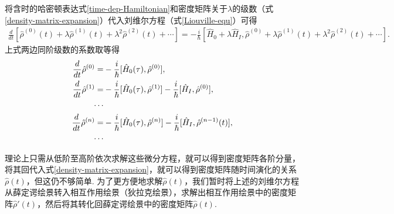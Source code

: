 \documentclass{assignment}
\begin{document}
将含时的哈密顿表达式\eqref{time-dep-Hamiltonian}和密度矩阵关于$\lambda$的级数（式\eqref{density-matrix-expansion}）代入刘维尔方程（式\eqref{Liouville-equ}）可得
\begin{align}
    \frac{d}{dt}\left[\hat{\rho}^{(0)}(t)+\lambda\hat{\rho}^{(1)}(t)+\lambda^2\hat{\rho}^{(2)}(t)+\cdots\right]=-\frac{i}{\hbar}\left[\hat{H}_0+\lambda\hat{H}_I,\hat{\rho}^{(0)}+\lambda\hat{\rho}^{(1)}(t)+\lambda^2\hat{\rho}^{(2)}(t)+\cdots\right].
\end{align}
上式两边同阶级数的系数取等得
\begin{align}
    \frac{d}{dt}\hat{\rho}^{(0)}=&-\frac{i}{\hbar}[\hat{H}_0(\tau),\hat{\rho}^{(0)}],\\
    \frac{d}{dt}\hat{\rho}^{(1)}=&-\frac{i}{\hbar}[\hat{H}_0(\tau),\hat{\rho}^{(1)}]-\frac{i}{\hbar}[\hat{H}_I,\hat{\rho}^{(0)}],\\
    \notag\cdots&\\
    \frac{d}{dt}\hat{\rho}^{(n)}=&-\frac{i}{\hbar}[\hat{H}_0(\tau),\hat{\rho}^{(n)}]-\frac{i}{\hbar}[\hat{H}_I,\hat{\rho}^{(n-1)}(t)],\\
    \notag\cdots&
\end{align}

理论上只需从低阶至高阶依次求解这些微分方程，就可以得到密度矩阵各阶分量，将其回代入式\eqref{density-matrix-expansion}，就可以得到密度矩阵随时间演化的关系$\hat{\rho}(t)$，但这仍不够简单. 为了更方便地求解$\hat{\rho}(t)$，我们暂时将上述的刘维尔方程从薛定谔绘景转入相互作用绘景（狄拉克绘景），求解出相互作用绘景中的密度矩阵$\hat{\rho}'(t)$，然后将其转化回薛定谔绘景中的密度矩阵$\hat{\rho}(t)$.
\end{document}
